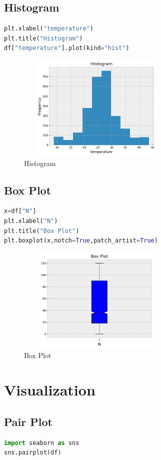 \subsection{Histogram}
\begin{lstlisting}[language=Python,basicstyle=\fontsize{9}{11}\selectfont]
plt.xlabel("temperature")
plt.title("Histogram")
df["temperature"].plot(kind="hist")
\end{lstlisting}
\begin{figure}[h]
\centering
 \footnotesize
 \includegraphics[width=3in,height=2in]{histogram.png}
\caption{Histogram}
\label{fig:dunnhalftone}
\end{figure}
\subsection{Box Plot}
\begin{lstlisting}[language=Python,basicstyle=\fontsize{9}{11}\selectfont]
x=df["N"]
plt.xlabel("N")
plt.title("Box Plot")
plt.boxplot(x,notch=True,patch_artist=True)
\end{lstlisting}
\begin{figure}[h]
\centering
 \footnotesize
 \includegraphics[width=3in,height=2in]{box.png}
\caption{Box Plot}
\label{fig:dunnhalftone}
\end{figure}
\section{Visualization}
\subsection{Pair Plot}
\begin{lstlisting}[language=Python,basicstyle=\fontsize{9}{11}\selectfont]
import seaborn as sns
sns.pairplot(df)
\end{lstlisting}
 

